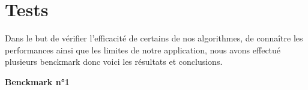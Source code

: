 \chapter{Tests}
Dans le but de vérifier l'efficacité de certains de nos algorithmes, de connaître les performances ainsi que les limites de notre application, nous avons effectué plusieurs benckmark donc voici les résultats et conclusions.

\textbf{Benckmark n°1}
